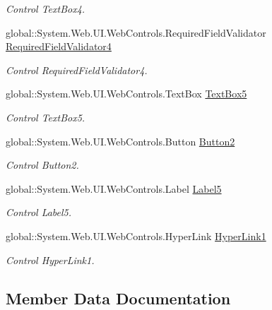 \begin{DoxyCompactItemize}
\begin{DoxyCompactList}\small\item\em Control Text\+Box4. \end{DoxyCompactList}\item 
global\+::\+System.\+Web.\+U\+I.\+Web\+Controls.\+Required\+Field\+Validator \mbox{\hyperlink{class_inicio_1_1_cambiar_password_a721210b960d80ff7c87c392dc8f4d78a}{Required\+Field\+Validator4}}
\begin{DoxyCompactList}\small\item\em Control Required\+Field\+Validator4. \end{DoxyCompactList}\item 
global\+::\+System.\+Web.\+U\+I.\+Web\+Controls.\+Text\+Box \mbox{\hyperlink{class_inicio_1_1_cambiar_password_a852585bbaa846d9076125c13ca2ad786}{Text\+Box5}}
\begin{DoxyCompactList}\small\item\em Control Text\+Box5. \end{DoxyCompactList}\item 
global\+::\+System.\+Web.\+U\+I.\+Web\+Controls.\+Button \mbox{\hyperlink{class_inicio_1_1_cambiar_password_ab2a855fe05cc706ac07c6308af3dcc54}{Button2}}
\begin{DoxyCompactList}\small\item\em Control Button2. \end{DoxyCompactList}\item 
global\+::\+System.\+Web.\+U\+I.\+Web\+Controls.\+Label \mbox{\hyperlink{class_inicio_1_1_cambiar_password_adabacc9becc23ab2219428532387a3b0}{Label5}}
\begin{DoxyCompactList}\small\item\em Control Label5. \end{DoxyCompactList}\item 
global\+::\+System.\+Web.\+U\+I.\+Web\+Controls.\+Hyper\+Link \mbox{\hyperlink{class_inicio_1_1_cambiar_password_a54fe9058b0b1415263161ac543de2e4f}{Hyper\+Link1}}
\begin{DoxyCompactList}\small\item\em Control Hyper\+Link1. \end{DoxyCompactList}\end{DoxyCompactItemize}


\subsection{Member Data Documentation}
\mbox{\label{class_inicio_1_1_cambiar_password_a1fb3744d75ceb088b1368122d0007cee}} 

